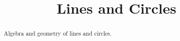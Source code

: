 \documentclass{ximera}
\title{Lines and Circles}
\begin{document}
\begin{abstract}
Algebra and geometry of lines and circles.
\end{abstract}
\maketitle
\end{document}
